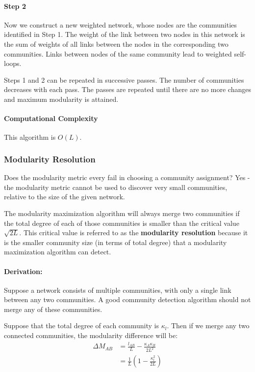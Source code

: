 \documentclass[11pt]{scrartcl} %
\begin{document}
\paragraph{Step 2} 
Now we construct a new weighted network, whose nodes are the communities identified in Step 1. The weight of the link between two nodes in this network is the sum of weights of all links between the nodes in the corresponding two communities. Links between nodes of the same community lead to weighted self-loops.  

Steps 1 and 2 can be repeated in successive passes. The number of communities decreases with each pass. The passes are repeated until there are no more changes and maximum modularity is attained.  

\paragraph{Computational Complexity} This algorithm is $O(L)$.

\subsubsection{Modularity Resolution}
Does the modularity metric every fail in choosing a community assignment? Yes - the modularity metric cannot be used to discover very small communities, relative to the size of the given network.  

The modularity maximization algorithm will always merge two communities if the total degree of each of those communities is smaller than the critical value $\sqrt{2L}$. This critical value is referred to as the \textbf{modularity resolution} because it is the smaller community size (in terms of total degree) that a modularity maximization algorithm can detect.

\paragraph{Derivation:} Suppose a network consists of multiple communities, with only a single link between any two communities. A good community detection algorithm should not merge any of these communities.

Suppose that the total degree of each community is $\kappa_l$. Then if we merge any two connected communities, the modularity difference will be:
\begin{align*}
	\Delta M_{AB} &= \frac{l_{AB}}{L} - \frac{\kappa_{A}\kappa_{B}}{2L^2} \\
	&= \frac{1}{L} \left( 1 - \frac{\kappa_l^2}{2L} \right)
\end{align*}
\end{document}
